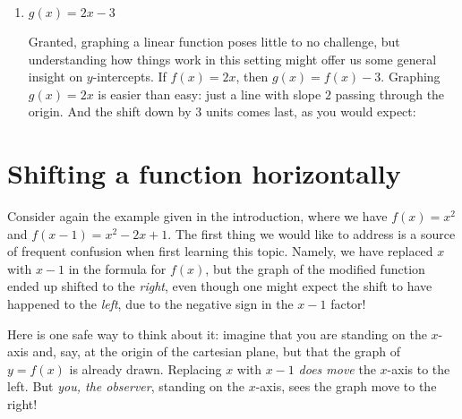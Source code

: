 \documentclass{ximera}
\begin{document}
\begin{example}
\begin{enumerate}[label=\alph*.]
\begin{explanation}
\begin{image}
\begin{tikzpicture}
        \end{tikzpicture}
      \end{image}
    \end{explanation}
  \item $g(x) = 2x-3$ \\[.5em]
    \begin{explanation}
      Granted, graphing a linear function poses little to no challenge, but understanding how things work in this setting might offer us some general insight on $y$-intercepts. If $f(x) = 2x$, then $g(x) = f(x)-3$. Graphing $g(x) = 2x$ is easier than easy: just a line with slope $2$ passing through the origin. And the shift down by $3$ units comes last, as you would expect:
            \begin{image}
      \end{image}
    \end{explanation}
  \end{enumerate}
\end{example}


\section{Shifting a function horizontally}

Consider again the example given in the introduction, where we have $f(x) = x^2$ and $f(x-1) = x^2-2x+1$. The first thing we would like to address is a source of frequent confusion when first learning this topic. Namely, we have replaced $x$ with $x-1$ in the formula for $f(x)$, but the graph of the modified function ended up shifted to the \emph{right}, even though one might expect the shift to have happened to the \emph{left}, due to the negative sign in the $x-1$ factor!

Here is one safe way to think about it: imagine that you are standing on the $x$-axis and, say, at the origin of the cartesian plane, but that the graph of $y=f(x)$ is already drawn. Replacing $x$ with $x-1$ \emph{does move} the $x$-axis to the left. But \emph{you, the observer}, standing on the $x$-axis, sees the graph move to the right!
\end{document}
